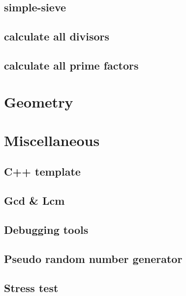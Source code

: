 \subsection{simple-sieve}
\raggedbottom
\hrulefill
\subsection{calculate all divisors}
\raggedbottom
\hrulefill
\subsection{calculate all prime factors}
\raggedbottom
\hrulefill

\section{Geometry}

\section{Miscellaneous}
\subsection{C++ template}
\raggedbottom
\hrulefill
\subsection{Gcd \& Lcm}
\raggedbottom
\hrulefill
\subsection{Debugging tools}
\raggedbottom
\hrulefill
\subsection{Pseudo random number generator}
\raggedbottom
\hrulefill
\subsection{Stress test}
\raggedbottom
\hrulefill
